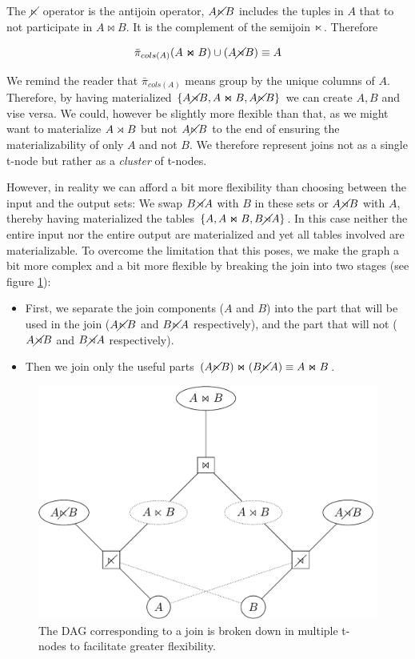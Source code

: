 The \(\cancel\ltimes\) operator is the antijoin operator, \(A \cancel\ltimes B\)
includes the tuples in \(A\) that to not participate in \(A \Join B\). It
is the complement of the semijoin \(\ltimes\). Therefore

\[ \bar{\pi}_{cols(A)}(A \Join B) \cup (A \cancel\rtimes B) \equiv A \]

We remind the reader that \(\bar{\pi}_{cols(A)}\) means group by the
unique columns of \(A\). Therefore, by having materialized \(\{A \cancel\rtimes B, A
\Join B, A \cancel\ltimes B\}\) we can create \({A,B}\) and vise versa. We could,
however be slightly more flexible than that, as we might want to
materialize \(A \rtimes B\) but not \(A \cancel\ltimes B\) to the end of ensuring
the materializability of only \(A\) and not \(B\). We therefore
represent joins not as a single t-node but rather as a \emph{cluster} of
t-nodes.

However, in reality we can afford a bit more flexibility than
choosing between the input and the output sets: We swap \(B \cancel\rtimes A\)
with \(B\) in these sets or \(A \cancel\rtimes B\) with \(A\), thereby having
materialized the tables \(\{A, A \Join B, B \cancel\rtimes A\}\). In this case
neither the entire input nor the entire output are materialized
and yet all tables involved are materializable. To overcome the
limitation that this poses, we make the graph a bit more complex
and a bit more flexible by breaking the join into two stages (see
figure \ref{fig:joinnet}):

\begin{itemize}
\item First, we separate the join components (\(A\) and \(B\)) into the
  part that will be used in the join (\(A \cancel\ltimes B\) and \(B \cancel\ltimes A\)
  respectively), and the part that will not (\(A \cancel\rtimes B\) and
  \(B \cancel\rtimes A\) respectively).
\item Then we join only the useful parts
  \((A \cancel\ltimes B) \Join (B \cancel\ltimes A) \equiv A \Join B\).
\end{itemize}

\begin{figure}[p]
  \centering \includegraphics[width=.9\linewidth]{./imgs/joinnet.pdf}
  \caption{\label{fig:joinnet}The DAG corresponding to a join is
    broken down in multiple t-nodes to facilitate greater
    flexibility.}
\end{figure}

